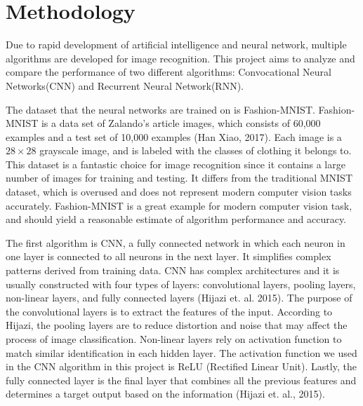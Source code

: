 \documentclass[letterpaper]{article} %
\begin{document}
	\section{Methodology}
	
	Due to rapid development of artificial intelligence and neural network, multiple algorithms are developed for image recognition. This project aims to analyze and compare the performance of two different algorithms: Convocational Neural Networks(CNN) and Recurrent Neural Network(RNN).
	
	The dataset that the neural networks are trained on is Fashion-MNIST. Fashion-MNIST is a data set of Zalando's article images, which consists of 60,000 examples and a test set of 10,000 examples (Han Xiao, 2017). Each image is a $28 \times 28$ grayscale image, and is labeled with the classes of clothing it belongs to. This dataset is a fantastic choice for image recognition since it contains a large number of images for training and testing. It differs from the traditional MNIST dataset, which is overused and does not represent modern computer vision tasks accurately. Fashion-MNIST is a great example for modern computer vision task, and should yield a reasonable estimate of algorithm performance and accuracy.
	
	The first algorithm is CNN, a fully connected network in which each neuron in one layer is connected to all neurons in the next layer. It simplifies complex patterns derived from training data. CNN has complex architectures and it is usually constructed with four types of layers: convolutional layers, pooling layers, non-linear layers, and fully connected layers (Hijazi et. al. 2015). The purpose of the convolutional layers is to extract the features of the input. According to Hijazi, the pooling layers are to reduce distortion and noise that may affect the process of image classification. Non-linear layers rely on activation function to match similar identification in each hidden layer. The activation function we used in the CNN algorithm in this project is ReLU (Rectified Linear Unit). Lastly, the fully connected layer is the final layer that combines all the previous features and determines a target output based on the information (Hijazi et. al., 2015).
	
\end{document}
